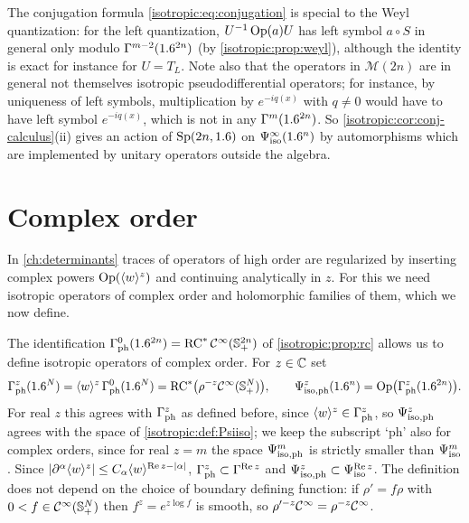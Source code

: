 The conjugation formula \eqref{isotropic:eq:conjugation} is special to the Weyl
quantization: for the left quantization, $U^{-1}\operatorname{Op}(a)U$ has left symbol
$a\circ S$ in general only modulo $\Gamma^{m-2}(1.6^{2n})$ (by
\cref{isotropic:prop:weyl}), although the identity is exact for instance for
$U=T_L$.
Note also that the operators in $\mathcal M(2n)$ are in general not themselves
isotropic pseudodifferential operators; for instance, by uniqueness of left
symbols, multiplication by $e^{-iq(x)}$ with $q\ne0$ would have to have left
symbol $e^{-iq(x)}$, which is not in any $\Gamma^{m}(1.6^{2n})$. So
\cref{isotropic:cor:conj-calculus}(ii) gives an action of $\mathrm{Sp}(2n,1.6)$
on $\Psi^{\infty}_{\mathrm{iso}}(1.6^n)$ by automorphisms which are implemented by unitary
operators outside the algebra.

\section{Complex order}\label{isotropic:sec:complex}

In \cref{ch:determinants} traces of operators of high order are
regularized by inserting complex powers $\operatorname{Op}(\langle w\rangle^z)$ and continuing
analytically in $z$. For this we need isotropic operators of complex order
and holomorphic families of them, which we now define.

The identification $\Gamma^{0}_{\mathrm{ph}}(1.6^{2n})=\operatorname{RC}^*\mathcal{C}^\infty(\mathbb{S}^{2n}_{+})$ of
\cref{isotropic:prop:rc} allows us to define isotropic operators of complex
order. For $z\in\mathbb{C}$ set
\begin{equation*}
  \Gamma^{z}_{\mathrm{ph}}(1.6^N)=\langle w\rangle^z\,\Gamma^{0}_{\mathrm{ph}}(1.6^N)=\operatorname{RC}^*\bigl(\rho^{-z}\mathcal{C}^\infty(\mathbb{S}^{N}_{+})\bigr),\qquad
  \Psi^{z}_{\mathrm{iso,ph}}(1.6^n)=\operatorname{Op}\bigl(\Gamma^{z}_{\mathrm{ph}}(1.6^{2n})\bigr).
\end{equation*}
For real $z$ this agrees with $\Gamma^{z}_{\mathrm{ph}}$ as defined before, since $\langle w\rangle^z\in\Gamma^{z}_{\mathrm{ph}}$,
so $\Psi^{z}_{\mathrm{iso,ph}}$ agrees with the space of \cref{isotropic:def:Psiiso}; we
keep the subscript `ph' also for complex orders, since for real $z=m$ the
space $\Psi^{m}_{\mathrm{iso,ph}}$ is strictly smaller than $\Psi^{m}_{\mathrm{iso}}$.
Since $|\partial^\alpha\langle w\rangle^z|\le C_\alpha\langle w\rangle^{\operatorname{Re}z-|\alpha|}$,
$\Gamma^{z}_{\mathrm{ph}}\subset\Gamma^{\operatorname{Re}z}$ and $\Psi^{z}_{\mathrm{iso,ph}}\subset\Psi^{\operatorname{Re}z}_{\mathrm{iso}}$. The
definition does not depend on the choice of boundary defining function: if
$\rho'=f\rho$ with $0<f\in\mathcal{C}^\infty(\mathbb{S}^{N}_{+})$ then $f^{z}=e^{z\log f}$ is smooth, so
$\rho'^{-z}\mathcal{C}^\infty=\rho^{-z}\mathcal{C}^\infty$.

